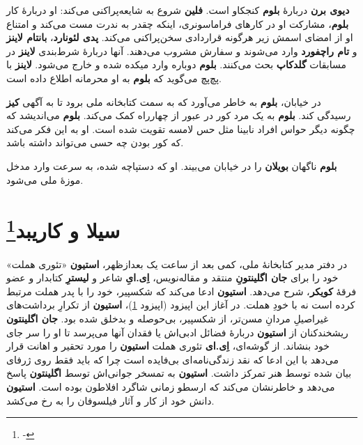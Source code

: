 \documentclass[12pt]{book}
\newcommand{\noun}[1]{{\textbf{#1}}}
\begin{document}
    \noun{دیوی برن} دربارهٔ \noun{بلوم} کنجکاو است. \noun{فلین} شروع به شایعه‌پراکنی می‌کند: او دربارهٔ کار \noun{بلوم}، مشارکت او در کارهای فراماسونری، اینکه چقدر به ندرت مست می‌کند و امتناع او از امضای اسمش زیر هرگونه قراردادی سخن‌پراکنی می‌کند. \noun{پدی لئونارد}، \noun{بانتام لاینز} و \noun{تام راچفورد} وارد می‌شوند و سفارش مشروب می‌دهند. آنها دربارهٔ شرط‌بندی \noun{لاینز} در مسابقات \noun{گلدکاپ} بحث می‌کنند. \noun{بلوم} دوباره وارد میکده شده و خارج می‌شود. \noun{لاینز} با پچ‌پچ می‌گوید که \noun{بلوم} به او محرمانه اطلاع داده است.

    در خیابان، \noun{بلوم} به خاطر می‌آورد که به سمت کتابخانه ملی برود تا به آگهی \noun{کیز} رسیدگی کند. \noun{بلوم} به یک مرد کور در عبور از چهارراه کمک می‌کند. \noun{بلوم} می‌اندیشد که چگونه دیگر حواس افراد نابینا مثل حس لامسه تقویت شده است. او به این فکر می‌کند که کور بودن چه حسی می‌تواند داشته باشد.

    \noun{بلوم} ناگهان \noun{بویلان} را در خیابان می‌بیند. او که دستپاچه شده، به سرعت وارد مدخل موزهٔ ملی می‌شود.

    \chapter[سیلا و کاریبد]{سیلا و کاریبد\protect\footnote{-}}\label{ep:9}

   در دفتر مدیر کتابخانهٔ ملی، کمی بعد از ساعت یک بعدازظهر، \noun{استیون} «تئوری هملت» خود را برای  \noun{جان اگلینتونِ} منتقد و مقاله‌نویس، \noun{اِی.ایِ} شاعر و \noun{لیسترِ} کتابدار و عضو فرقهٔ \noun{کویکر}، شرح می‌دهد. \noun{استیون} ادعا می‌کند که شکسپیر، خود را با پدر هملت مرتبط کرده است نه با خودِ هملت. در آغاز این اپیزود (اپیزود \ref{ep:9})، \noun{استیون} از تکرارِ برداشت‌های غیراصیلِ مردانِ مسن‌تر، از شکسپیر، بی‌حوصله و بدخلق شده بود. \noun{جان اگلینتون}  ریشخندکنان از \noun{استیون} دربارهٔ فضائل ادبی‌اش یا فقدان آنها می‌پرسد تا او را سر جای خود بنشاند. از گوشه‌ای، \noun{اِی.ای} تئوری هملت \noun{استیون} را مورد تحقیر و اهانت قرار می‌دهد با این ادعا که نقد زندگی‌نامه‌ای بی‌فایده است چرا که باید فقط روی ژرفای بیان شده توسط هنر تمرکز داشت. \noun{استیون} به تمسخر جوانی‌اش توسط \noun{اگلینتون} پاسخ می‌دهد و خاطرنشان می‌کند که ارسطو زمانی شاگرد افلاطون بوده است. \noun{استیون} دانش خود از کار و آثار فیلسوفان را به رخ می‌کشد.
\end{document}
